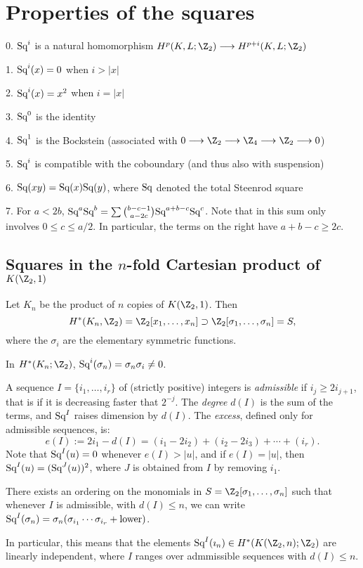 \documentclass[11pt]{article}
\begin{document}
\section{Properties of the squares}
\begin{itemise}
\item[0.] $\textup{Sq}^i$ is a natural homomorphism $H^p(K,L;\Z_2)\to H^{p+i}(K,L;\Z_2)$
\item[1.] $\textup{Sq}^i(x)=0$ when $i>|x|$
\item[2.] $\textup{Sq}^i(x)=x^2$ when $i=|x|$
\item[3.] $\textup{Sq}^0$ is the identity
\item[4.] $\textup{Sq}^1$ is the Bockstein (associated with $0\to\Z_2\to\Z_4\to\Z_2\to0$)
\item[5.] $\textup{Sq}^i$ is compatible with the coboundary (and thus also with suspension)
\item[6.] $\textup{Sq}(xy)=\textup{Sq}(x)\textup{Sq}(y)$, where $\textup{Sq}$ denoted the total Steenrod square
\item[7.] For $a<2b$, $\textup{Sq}^a\textup{Sq}^b=\sum\binom{b-c-1}{a-2c}\textup{Sq}^{a+b-c}\textup{Sq}^c$. Note that in this sum only involves $0\leq c\leq a/2$. In particular, the terms on the right have $a+b-c\geq 2c$.
\end{itemise}
\setcounter{subsection}{2}
\subsection{Squares in the \texorpdfstring{$n$-fold}{n-fold} Cartesian product of \texorpdfstring{$K(\Z_2,1)$}{K(Z/2,1)}}
Let $K_n$ be the product of $n$ copies of $K(\Z_2,1)$. Then 
\[H^*(K_n,\Z_2)=\Z_2[x_1,\ldots,x_n]\supset\Z_2[\sigma_1,\ldots,\sigma_n]=S,\]
where the $\sigma_i$ are the elementary symmetric functions.


\begin{prop*}
In $H^*(K_n;\Z_2)$, $\textup{Sq}^i(\sigma_n)=\sigma_n\sigma_i\neq0$.
\end{prop*}
A sequence $I=\{i_1,\ldots,i_r\}$ of (strictly positive) integers is \emph{admissible} if $i_j\geq 2i_{j+1}$, that is if it is decreasing faster that $2^{-j}$. The \emph{degree} $d(I)$ is the sum of the terms, and $\textup{Sq}^I$ raises dimension by $d(I)$. The \emph{excess}, defined only for admissible sequences, is:
\[e(I):=2i_1-d(I)=(i_1-2i_2)+(i_2-2i_3)+\cdots+(i_r).\]
Note that $\textup{Sq}^I(u)=0$ whenever $e(I)>|u|$, and if $e(I)=|u|$, then $\textup{Sq}^I(u)=(\textup{Sq}^J(u))^2$, where $J$ is obtained from $I$ by removing $i_1$.
\begin{thm*}
There exists an ordering on the monomials in $S=\Z_2[\sigma_1,\ldots,\sigma_n]$ such that whenever $I$ is admissible, with $d(I)\leq n$, we can write $\textup{Sq}^I(\sigma_n)=\sigma_n(\sigma_{i_1}\cdots\sigma_{i_r}+\textup{lower})$.
\end{thm*}
In particular, this means that the elements $\Squ^I(\imath_n)\in H^*(K(\Z_2,n);\Z_2)$ are linearly independent, where $I$ ranges over admmissible sequences with $d(I)\leq n$.
\end{document}
